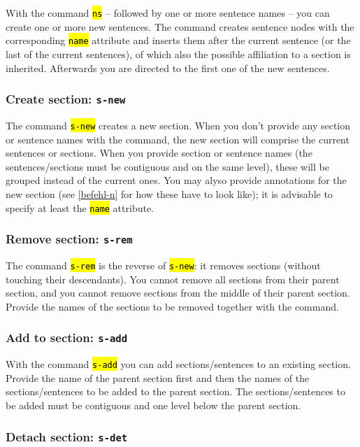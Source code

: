 \documentclass[12pt]{scrartcl}
\newcommand{\code}[1]{\hl{\texttt{#1}}}
\begin{document}
With the command \code{ns} – followed by one or more sentence names – you can create one or more new sentences.
The command creates sentence nodes with the corresponding \code{name} attribute and inserts them after the current sentence (or the last of the current sentences), of which also the possible affiliation to a section is inherited.
Afterwards you are directed to the first one of the new sentences.

\subsubsection{Create section: \texttt{s-new}}

The command \code{s-new} creates a new section.
When you don’t provide any section or sentence names with the command, the new section will comprise the current sentences or sections.
When you provide section or sentence names (the sentences/sections must be contiguous and on the same level), these will be grouped instead of the current ones.
You may alyso provide annotations for the new section (see \ref{befehl-n} for how these have to look like); it is advisable to specify at least the \code{name} attribute.

\subsubsection{Remove section: \texttt{s-rem}}

The command \code{s-rem} is the reverse of \code{s-new}: it removes sections (without touching their descendants).
You cannot remove all sections from their parent section, and you cannot remove sections from the middle of their parent section.
Provide the names of the sections to be removed together with the command.

\subsubsection{Add to section: \texttt{s-add}}

With the command \code{s-add} you can add sections/sentences to an existing section.
Provide the name of the parent section first and then the names of the sections/sentences to be added to the parent section.
The sections/sentences to be added must be contiguous and one level below the parent section.

\subsubsection{Detach section: \texttt{s-det}}
\end{document}
